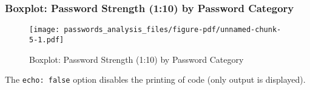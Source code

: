 \documentclass[
  letterpaper,
  DIV=11,
  numbers=noendperiod]{scrartcl}
\begin{document}
\subsubsection{Boxplot: Password Strength (1:10) by Password
Category}\label{boxplot-password-strength-110-by-password-category}

\begin{figure}[H]

{\centering \texttt{[image: passwords\_analysis\_files/figure-pdf/unnamed-chunk-5-1.pdf]}

}

\caption{Boxplot: Password Strength (1:10) by Password Category}

\end{figure}%

The \texttt{echo:\ false} option disables the printing of code (only
output is displayed).
\end{document}

